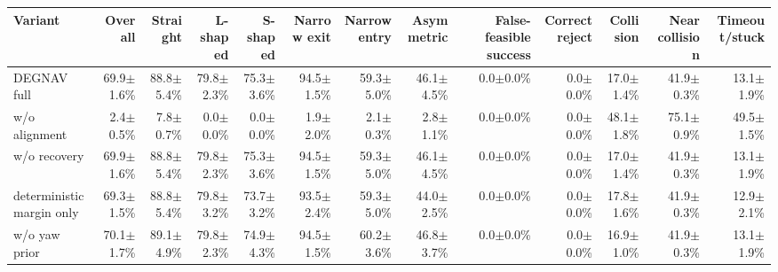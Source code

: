 \begin{tabular}{lrrrrrrrrrrrr}
\toprule
Variant & Overall & Straight & L-shaped & S-shaped & Narrow exit & Narrow entry & Asymmetric & False-feasible success & Correct reject & Collision & Near collision & Timeout/stuck \\
\midrule
DEGNAV full & 69.9$\pm$1.6\% & 88.8$\pm$5.4\% & 79.8$\pm$2.3\% & 75.3$\pm$3.6\% & 94.5$\pm$1.5\% & 59.3$\pm$5.0\% & 46.1$\pm$4.5\% & 0.0$\pm$0.0\% & 0.0$\pm$0.0\% & 17.0$\pm$1.4\% & 41.9$\pm$0.3\% & 13.1$\pm$1.9\% \\
w/o alignment & 2.4$\pm$0.5\% & 7.8$\pm$0.7\% & 0.0$\pm$0.0\% & 0.0$\pm$0.0\% & 1.9$\pm$2.0\% & 2.1$\pm$0.3\% & 2.8$\pm$1.1\% & 0.0$\pm$0.0\% & 0.0$\pm$0.0\% & 48.1$\pm$1.8\% & 75.1$\pm$0.9\% & 49.5$\pm$1.5\% \\
w/o recovery & 69.9$\pm$1.6\% & 88.8$\pm$5.4\% & 79.8$\pm$2.3\% & 75.3$\pm$3.6\% & 94.5$\pm$1.5\% & 59.3$\pm$5.0\% & 46.1$\pm$4.5\% & 0.0$\pm$0.0\% & 0.0$\pm$0.0\% & 17.0$\pm$1.4\% & 41.9$\pm$0.3\% & 13.1$\pm$1.9\% \\
deterministic margin only & 69.3$\pm$1.5\% & 88.8$\pm$5.4\% & 79.8$\pm$3.2\% & 73.7$\pm$3.2\% & 93.5$\pm$2.4\% & 59.3$\pm$5.0\% & 44.0$\pm$2.5\% & 0.0$\pm$0.0\% & 0.0$\pm$0.0\% & 17.8$\pm$1.6\% & 41.9$\pm$0.3\% & 12.9$\pm$2.1\% \\
w/o yaw prior & 70.1$\pm$1.7\% & 89.1$\pm$4.9\% & 79.8$\pm$2.3\% & 74.9$\pm$4.3\% & 94.5$\pm$1.5\% & 60.2$\pm$3.6\% & 46.8$\pm$3.7\% & 0.0$\pm$0.0\% & 0.0$\pm$0.0\% & 16.9$\pm$1.0\% & 41.9$\pm$0.3\% & 13.1$\pm$1.9\% \\
\bottomrule
\end{tabular}
